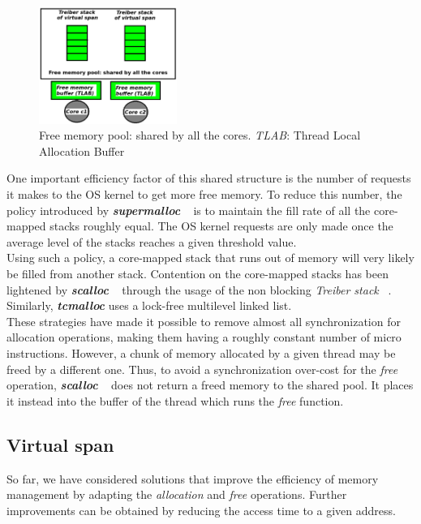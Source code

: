 \documentclass[10pt]{article}											%
\begin{document}
\begin{figure}[H]
    \centering
    \includegraphics[width=0.4\textwidth]{charts/globalArchitecture.png}
    \caption[Caption for FN]{Free memory pool: shared by all the cores. \emph{TLAB}: Thread Local Allocation Buffer}
    \label{globalArchitecture.png}
\end{figure}

One important efficiency factor of this shared structure is the number of requests it makes to the OS kernel to get more free memory.   To reduce this number, the policy introduced by \textbf{\textit{supermalloc}} ~\cite{supermalloc_kuszmaul} is to maintain the fill rate of all the core-mapped stacks roughly equal.   The OS kernel requests are only made once the average level of the stacks reaches a given threshold value.\\
Using such a policy, a core-mapped stack that runs out of memory will very likely be filled from another stack.  Contention on the core-mapped stacks has been lightened by \textbf{\textit{scalloc}} ~\cite{scalloc_aigner} through the usage of the non blocking \textit{Treiber stack} ~\cite{treiberStack}.   Similarly, \textbf{\textit{tcmalloc}} uses a lock-free multilevel linked list.\\

These strategies have made it possible to remove almost all synchronization for allocation operations, making them having a roughly constant number of micro instructions.   However, a chunk of memory allocated by a given thread may be freed by a different one.   Thus, to avoid a synchronization over-cost for the \textit{free} operation, \textbf{\textit{scalloc}} ~\cite{scalloc_aigner} does not return a freed memory to the shared pool.  It places it instead into the buffer of the thread which runs the \textit{free} function.



\subsection{Virtual span} \label{virtualSpanDefinition}
So far, we have considered solutions that improve the efficiency of memory management by adapting the \textit{allocation} and \textit{free} operations.   Further improvements can be obtained by reducing the access time to a given address.
\end{document}
